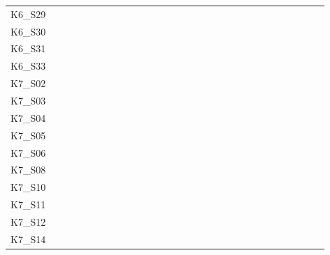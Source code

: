 \begin{table}[htpb]
\begin{tabular}{l|rrrrrrrrrrrrrrrrrrrrrrrrrrrr}
        K6\_S29 & \n & \n & \n & \n & \n & \n & \n & \n & \n & \n & \n & \n & \n & \n & \n & \n & \n & \n & \n & \n & \n & \n & \n & \n & \n & \n & \n & \n \\
        K6\_S30 & \n & \n & \n & \n & \n & \n & \n & \n & \n & \n & \n & \n & \n & \n & \n & \n & \n & \n & \n & \n & \n & \n & \n & \n & \n & \n & \n & \n \\
        K6\_S31 & \n & \n & \n & \n & \n & \n & \n & \n & \n & \e & \n & \n & \e & \n & \n & \n & \n & \n & \n & \n & \n & \n & \e & \n & \n & \e & \n & \n \\
        K6\_S33 & \n & \n & \n & \e & \n & \n & \n & \e & \n & \e & \n & \n & \e & \n & \n & \n & \n & \n & \n & \n & \n & \n & \n & \n & \n & \e & \n & \n \\
        K7\_S02 & \n & \n & \n & \n & \n & \n & \n & \n & \n & \n & \n & \n & \n & \n & \n & \n & \n & \n & \n & \n & \e & \n & \n & \n & \n & \n & \e & \n \\
        K7\_S03 & \n & \n & \n & \n & \n & \n & \n & \n & \n & \n & \n & \n & \e & \n & \n & \n & \n & \n & \n & \n & \n & \n & \n & \n & \n & \n & \n & \n \\
        K7\_S04 & \n & \n & \n & \n & \n & \n & \n & \n & \n & \n & \n & \n & \n & \n & \n & \n & \n & \n & \n & \n & \n & \n & \n & \n & \n & \n & \n & \n \\
        K7\_S05 & \n & \n & \n & \n & \n & \n & \n & \n & \n & \n & \n & \n & \n & \n & \n & \n & \n & \n & \n & \n & \n & \n & \n & \n & \n & \n & \n & \n \\
        K7\_S06 & \n & \n & \n & \n & \n & \n & \n & \n & \n & \n & \n & \n & \n & \n & \n & \n & \n & \n & \n & \n & \n & \n & \n & \n & \n & \n & \n & \n \\
        K7\_S08 & \n & \n & \n & \n & \n & \n & \n & \n & \n & \n & \n & \n & \n & \n & \n & \n & \n & \n & \n & \n & \n & \n & \n & \n & \n & \n & \n & \n \\
        K7\_S10 & \n & \n & \n & \n & \n & \n & \n & \n & \n & \n & \n & \n & \n & \n & \n & \n & \n & \n & \n & \n & \e & \n & \n & \n & \n & \n & \n & \n \\
        K7\_S11 & \n & \n & \n & \n & \n & \n & \n & \n & \n & \n & \n & \n & \n & \n & \n & \n & \n & \n & \n & \n & \n & \n & \n & \n & \n & \n & \n & \n \\
        K7\_S12 & \n & \n & \n & \n & \n & \n & \n & \n & \n & \n & \n & \n & \n & \e & \n & \n & \n & \n & \n & \n & \n & \n & \n & \n & \n & \n & \n & \n \\
        K7\_S14 & \n & \n & \n & \n & \n & \n & \n & \n & \n & \n & \e & \n & \n & \n & \n & \n & \n & \n & \n & \n & \n & \n & \n & \n & \n & \n & \n & \n \\

\end{tabular}
\end{table}
